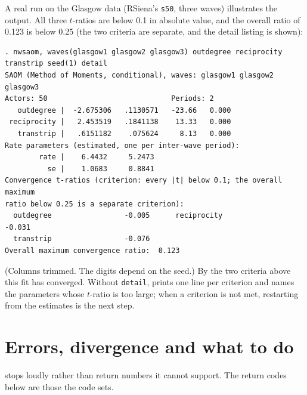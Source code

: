 A real run on the Glasgow data (RSiena's \texttt{s50}, three waves) illustrates the output. All three $t$-ratios are below 0.1 in absolute value, and the overall ratio of 0.123 is below 0.25 (the two criteria are separate, and the detail listing is shown):
\begin{lstlisting}
. nwsaom, waves(glasgow1 glasgow2 glasgow3) outdegree reciprocity transtrip seed(1) detail
SAOM (Method of Moments, conditional), waves: glasgow1 glasgow2 glasgow3
Actors: 50                             Periods: 2
   outdegree |  -2.675306   .1130571   -23.66   0.000
 reciprocity |   2.453519   .1841138    13.33   0.000
   transtrip |   .6151182    .075624     8.13   0.000
Rate parameters (estimated, one per inter-wave period):
        rate |    6.4432     5.2473
          se |    1.0683     0.8841
Convergence t-ratios (criterion: every |t| below 0.1; the overall maximum
ratio below 0.25 is a separate criterion):
  outdegree                 -0.005      reciprocity               -0.031
  transtrip                 -0.076
Overall maximum convergence ratio:  0.123
\end{lstlisting}
(Columns trimmed. The digits depend on the seed.) By the two criteria above this fit has converged. Without \texttt{detail}, \nwsaom{} prints one line per criterion and names the parameters whose $t$-ratio is too large; when a criterion is not met, restarting from the estimates is the next step.

\section{Errors, divergence and what to do}
\nwsaom{} stops loudly rather than return numbers it cannot support. The return codes below are those the code sets.

